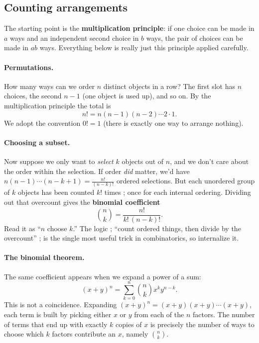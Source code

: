 \documentclass{report}
\numberwithin{equation}{section}
\begin{document}
\subsection{Counting arrangements}
The starting point is the \textbf{multiplication principle}: if one choice can be made in $a$ ways and an independent second choice in $b$ ways, the pair of choices can be made in $ab$ ways. Everything below is really just this principle applied carefully.

\paragraph{Permutations.} How many ways can we order $n$ distinct objects in a row? The first slot has $n$ choices, the second $n-1$ (one object is used up), and so on. By the multiplication principle the total is
\begin{equation}
	n! = n(n-1)(n-2)\cdots 2\cdot 1.
\end{equation}
We adopt the convention $0!=1$ (there is exactly one way to arrange nothing).

\paragraph{Choosing a subset.} Now suppose we only want to \emph{select} $k$ objects out of $n$, and we don't care about the order within the selection. If order \emph{did} matter, we'd have $n(n-1)\cdots(n-k+1) = \frac{n!}{(n-k)!}$ ordered selections. But each unordered group of $k$ objects has been counted $k!$ times ; once for each internal ordering. Dividing out that overcount gives the \textbf{binomial coefficient}
\begin{equation}
	\binom{n}{k} = \frac{n!}{k!\,(n-k)!}.
\end{equation}
Read it as ``$n$ choose $k$.'' The logic ; ``count ordered things, then divide by the overcount'' ; is the single most useful trick in combinatorics, so internalize it.

\paragraph{The binomial theorem.} The same coefficient appears when we expand a power of a sum:
\begin{equation}
	(x+y)^n = \sum_{k=0}^{n}\binom{n}{k}x^k y^{n-k}.
\end{equation}
This is not a coincidence. Expanding $(x+y)^n = (x+y)(x+y)\cdots(x+y)$, each term is built by picking either $x$ or $y$ from each of the $n$ factors. The number of terms that end up with exactly $k$ copies of $x$ is precisely the number of ways to choose which $k$ factors contribute an $x$, namely $\binom{n}{k}$.
\end{document}
